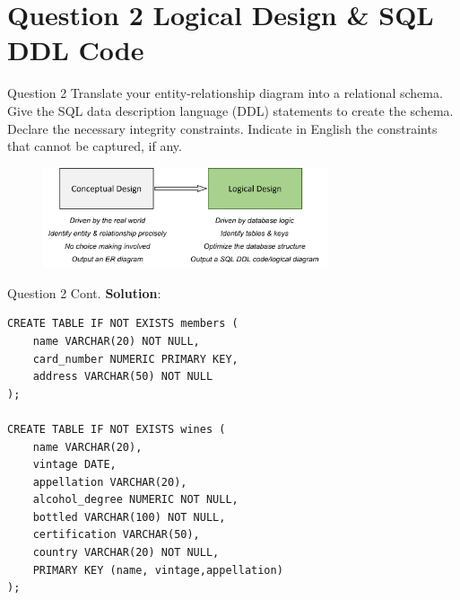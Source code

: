 \section*{Question 2 Logical Design \& SQL DDL Code}

\begin{frame}[fragile]{Question 2}
Translate your entity-relationship diagram into a relational schema. Give the SQL data description language (DDL) statements to create the schema. Declare the necessary integrity constraints. Indicate in English the constraints that cannot be captured, if any.\\ \vspace{15pt}

\begin{figure}
	\includegraphics[width=0.75\textwidth, trim=0 0 0 0, clip]{t4/images/step2.png}
\end{figure}
\end{frame}

\begin{frame}[fragile]{Question 2 Cont.}
\textbf{Solution}:
\begin{lstlisting}
CREATE TABLE IF NOT EXISTS members (
	name VARCHAR(20) NOT NULL,
	card_number NUMERIC PRIMARY KEY,
	address VARCHAR(50) NOT NULL
);

CREATE TABLE IF NOT EXISTS wines (
	name VARCHAR(20),
	vintage DATE,
	appellation VARCHAR(20),
	alcohol_degree NUMERIC NOT NULL,
	bottled VARCHAR(100) NOT NULL,
	certification VARCHAR(50),
	country VARCHAR(20) NOT NULL,
	PRIMARY KEY (name, vintage,appellation)
);

\end{lstlisting}
\end{frame}

